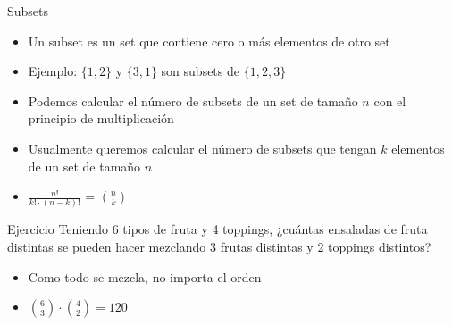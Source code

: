 \documentclass[10pt]{beamer}
\newcommand{\bi}{\begin{itemize}}
\newcommand{\ei}{\end{itemize}}
\begin{document}
\begin{frame}{Subsets}
  \bi
    \item Un subset es un set que contiene cero o más elementos de otro set
    \item Ejemplo: $\{1, 2\}$ y $\{3, 1\}$ son subsets de $\{1, 2, 3\}$
    \item<2-> Podemos calcular el número de subsets de un set de tamaño $n$ con el principio de multiplicación
    \item<2-> Usualmente queremos calcular el número de subsets que tengan $k$ elementos de un set de tamaño $n$
    \item<3-> \huge{$\frac{n!}{k! \cdot (n-k)!}$ = $\binom{n}{k}$}
  \ei
\end{frame}

\begin{frame}{Ejercicio}
  Teniendo 6 tipos de fruta y 4 toppings, ¿cuántas ensaladas de fruta distintas se pueden hacer 
  mezclando 3 frutas distintas y 2 toppings distintos?

  \bi
    \item Como todo se mezcla, no importa el orden
    \item<2-> $\binom{6}{3} \cdot \binom{4}{2} = 120$
  \ei
\end{frame}
\end{document}
